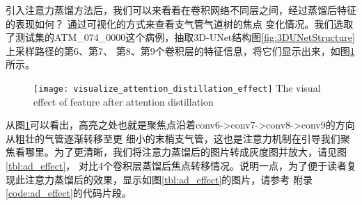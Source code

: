 引入注意力蒸馏方法后，我们可以来看看在卷积网络不同层之间，经过蒸馏后特征的表现如何？ 通过可视化的方式来查看支气管气道树的焦点
变化情况。我们选取了测试集的ATM\_074\_0000这个病例，抽取3D-UNet结构图\ref{fig:3DUNetStructure}上采样路径的第6、第7、
第8、第9个卷积层的特征信息，将它们显示出来，如图\ref{fig:ad_effect}所示。
\begin{figure}[ht]
    \centering
    \texttt{[image: visualize\_attention\_distillation\_effect]}
        {The visual effect of feature after attention distillation}
    \label{fig:ad_effect}
\end{figure}
从图\ref{fig:ad_effect}可以看出，高亮之处也就是聚焦点沿着conv6->conv7->conv8->conv9的方向从粗壮的气管逐渐转移至更
细小的末梢支气管，这也是注意力机制在引导我们聚焦看哪里。为了更清晰，我们将注意力蒸馏后的图片转成灰度图并放大，请见图\ref{tbl:ad_effect}，
对比4个卷积层蒸馏后焦点转移情况。说明一点，为了便于读者复现此注意力蒸馏后的效果，显示如图\ref{tbl:ad_effect}的图片，请参考
附录\ref{code:ad_effect}的代码片段。

